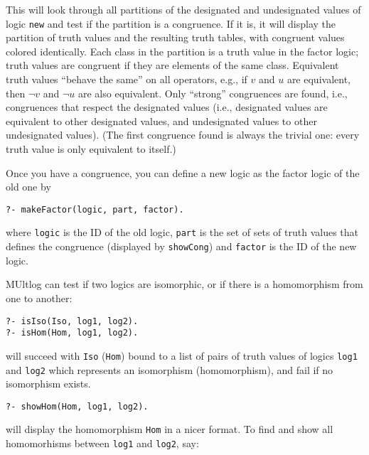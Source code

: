 \documentclass[
]{article}
\newcommand{\passthrough}[1]{#1}
\begin{document}
This will look through all partitions of the designated and undesignated
values of logic \passthrough{\lstinline!new!} and test if the partition
is a congruence. If it is, it will display the partition of truth values
and the resulting truth tables, with congruent values colored
identically. Each class in the partition is a truth value in the factor
logic; truth values are congruent if they are elements of the same
class. Equivalent truth values ``behave the same'' on all operators,
e.g., if \(v\) and \(u\) are equivalent, then \(\lnot v\) and
\(\lnot u\) are also equivalent. Only ``strong'' congruences are found,
i.e., congruences that respect the designated values (i.e., designated
values are equivalent to other designated values, and undesignated
values to other undesignated values). (The first congruence found is
always the trivial one: every truth value is only equivalent to itself.)

Once you have a congruence, you can define a new logic as the factor
logic of the old one by

\begin{lstlisting}
?- makeFactor(logic, part, factor).
\end{lstlisting}

where \passthrough{\lstinline!logic!} is the ID of the old logic,
\passthrough{\lstinline!part!} is the set of sets of truth values that
defines the congruence (displayed by \passthrough{\lstinline!showCong!})
and \passthrough{\lstinline!factor!} is the ID of the new logic.

MUltlog can test if two logics are isomorphic, or if there is a
homomorphism from one to another:

\begin{lstlisting}
?- isIso(Iso, log1, log2).
?- isHom(Hom, log1, log2).
\end{lstlisting}

will succeed with \passthrough{\lstinline!Iso!}
(\passthrough{\lstinline!Hom!}) bound to a list of pairs of truth values
of logics \passthrough{\lstinline!log1!} and
\passthrough{\lstinline!log2!} which represents an isomorphism
(homomorphism), and fail if no isomorphism exists.

\begin{lstlisting}
?- showHom(Hom, log1, log2).
\end{lstlisting}

will display the homomorphism \passthrough{\lstinline!Hom!} in a nicer
format. To find and show all homomorhisms between
\passthrough{\lstinline!log1!} and \passthrough{\lstinline!log2!}, say:
\end{document}
